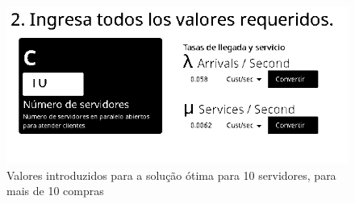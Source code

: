 \begin{figure}[<+htpb+>]
	\centering
	\includegraphics[scale=0.75]{./report/img/mais10/S10_valor.png}
	\caption{Valores introduzidos para a solução ótima para 10 servidores, para
	mais de 10 compras }
\label{fig:figure2}
\end{figure}

